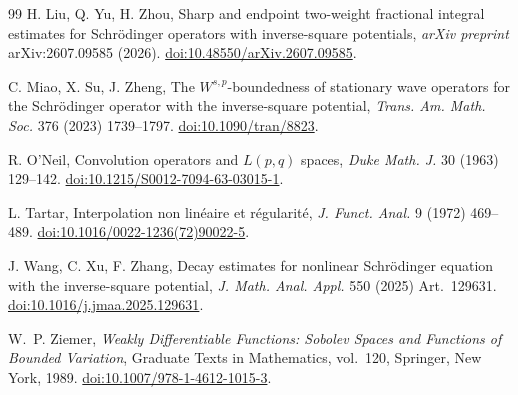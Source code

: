 \documentclass[preprint,12pt]{elsarticle}
\numberwithin{equation}{section}
\theoremstyle{definition}
\theoremstyle{remark}
\begin{document}
\begin{thebibliography}{99}
H. Liu, Q. Yu, H. Zhou,
Sharp and endpoint two-weight fractional integral estimates for
Schr\"odinger operators with inverse-square potentials,
\emph{arXiv preprint} arXiv:2607.09585 (2026).
\href{https://doi.org/10.48550/arXiv.2607.09585}
{doi:10.48550/arXiv.2607.09585}.


C. Miao, X. Su, J. Zheng,
The $W^{s,p}$-boundedness of stationary wave operators for the
Schr\"odinger operator with the inverse-square potential,
\emph{Trans. Am. Math. Soc.} 376 (2023) 1739--1797.
\href{https://doi.org/10.1090/tran/8823}
{doi:10.1090/tran/8823}.

R. O'Neil,
Convolution operators and $L(p,q)$ spaces,
\emph{Duke Math. J.} 30 (1963) 129--142.
\href{https://doi.org/10.1215/S0012-7094-63-03015-1}
{doi:10.1215/S0012-7094-63-03015-1}.


L. Tartar,
Interpolation non lin\'eaire et r\'egularit\'e,
\emph{J. Funct. Anal.} 9 (1972) 469--489.
\href{https://doi.org/10.1016/0022-1236(72)90022-5}
{doi:10.1016/0022-1236(72)90022-5}.

J. Wang, C. Xu, F. Zhang,
Decay estimates for nonlinear Schr\"odinger equation with the
inverse-square potential,
\emph{J. Math. Anal. Appl.} 550 (2025) Art.~129631.
\href{https://doi.org/10.1016/j.jmaa.2025.129631}
{doi:10.1016/j.jmaa.2025.129631}.

W.~P. Ziemer,
\emph{Weakly Differentiable Functions: Sobolev Spaces and Functions of
Bounded Variation},
Graduate Texts in Mathematics, vol.~120,
Springer, New York, 1989.
\href{https://doi.org/10.1007/978-1-4612-1015-3}
{doi:10.1007/978-1-4612-1015-3}.

\end{thebibliography}
\end{document}

